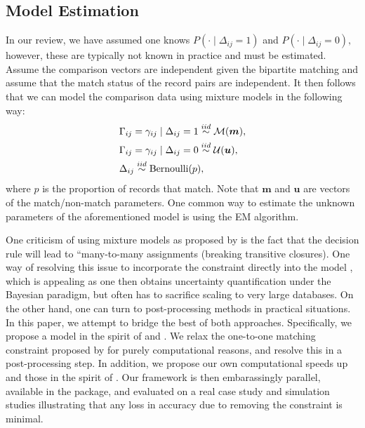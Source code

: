 \documentclass[12pt,letterpaper]{article}
\newcommand{\1}[1]{\mathbb{I}\!\left[#1\right]} %
\begin{document}
\subsection{Model Estimation}
In our review, we have assumed one knows $P(\cdot \mid \Delta_{ij} = 1)$ and $P(\cdot \mid \Delta_{ij} = 0),$ however, these are typically not known in practice and must be estimated. Assume the comparison vectors are independent given the bipartite matching and assume that the match status of the record pairs are independent. It then follows that we can model 
the comparison data using mixture models in the following way:
\begin{align}
&\Gamma_{ij} = \gamma_{ij} \mid \Delta_{ij} = 1 \stackrel{iid}{\sim} \mathcal{M}(\bm{m}), \\
&\Gamma_{ij} = \gamma_{ij} \mid \Delta_{ij} = 0  \stackrel{iid}{\sim} \mathcal{U}(\bm{u}), \notag\\
& \Delta_{ij}   \stackrel{iid}{\sim} \text{Bernoulli}(p), \notag
\end{align}
where $p$ is the proportion of records that match. Note that $\bm{m}$ and $\bm{u}$ are vectors of the match/non-match parameters. One common way to estimate the unknown parameters of the aforementioned model is using the EM algorithm. 


One criticism of using mixture models as proposed by \cite{jaro1989} is the fact that the decision rule will lead to ``many-to-many assignments (breaking transitive closures). One way of resolving this issue to incorporate the constraint directly into the model \citep{Fortinietal01, Matsakis10, liseo_jos_2011, liseo_2011, Larsen05, Larsen12, gutman_bayesian_2013, sadinle_bayesian_2017}, which is appealing as one then obtains uncertainty quantification under the Bayesian paradigm, but often has to sacrifice scaling to very large databases. On the other hand, one can turn to post-processing methods in practical situations. In this paper, we attempt to bridge the best of both approaches. Specifically, we propose a model in the spirit of \cite{sadinle_bayesian_2017} and \cite{enamorado_using_2019}. We relax the one-to-one matching constraint proposed by  \cite{sadinle_bayesian_2017} for purely computational reasons, and resolve this in a post-processing step. In addition, we propose our own computational speeds up and those in the spirit of \cite{enamorado_using_2019}. Our framework is then embarassingly parallel, available in the  package, and evaluated on a real case study and simulation studies illustrating that any loss in accuracy due to removing the constraint is minimal. 
\end{document}
